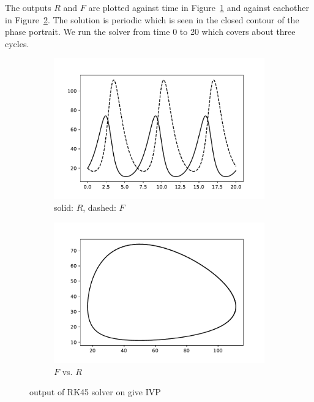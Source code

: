 \documentclass[10pt]{article}
\begin{document}
\begin{solution}[Solution]
The outputs \( R \) and \( F \) are plotted against time in Figure~\ref{vs} and against eachother in Figure~\ref{phase}. The solution is periodic which is seen in the closed contour of the phase portrait. We run the solver from time 0 to 20 which covers about three cycles.
\begin{figure}[H]\centering
    \begin{subfigure}{.48\textwidth}
        \includegraphics[width=\textwidth]{img/6/solution.pdf}
        \caption{solid: \( R \), dashed: \( F \)}
        \label{vs}
    \end{subfigure}
    \begin{subfigure}{.48\textwidth}
        \includegraphics[width=\textwidth]{img/6/phase.pdf}
        \caption{\( F \) vs. \( R \)}
        \label{phase}
    \end{subfigure}
    \caption{output of RK45 solver on give IVP}
    \label{p6}
\end{figure}

\end{solution}
\end{document}
